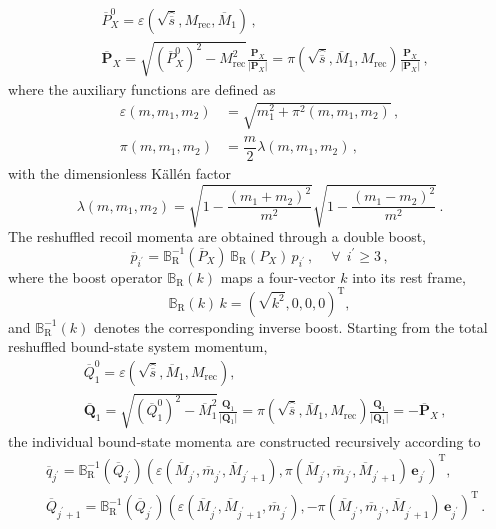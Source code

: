 \begin{align}
    &\overline{P}_X^0 = \varepsilon\!\left(\sqrt{\hat{\overline{s}}},M_\mathrm{rec},\overline{M}_{1}\right)\,,\\
    &\overline{\bm P}_X = \sqrt{\left(\overline{P}_X^0\right)^2-M_{\mathrm{rec}}^2}\frac{\bm{P}_X}{\vert \bm{P}_X \vert}=\pi\!\left(\sqrt{\hat{\overline{s}}},\overline{M}_{1},M_\mathrm{rec}\right)\frac{\bm{P}_X}{\vert \bm{P}_X \vert}\,,
\end{align}
where the auxiliary functions are defined as
\begin{align}
    \varepsilon(m,m_1,m_2) & = \sqrt{m_1^2 + \pi^2(m,m_1,m_2)}\,,\\
    \pi(m,m_1,m_2) & = \dfrac{m}{2}\lambda(m,m_1,m_2)\,,
\end{align}
with the dimensionless K\"all\'en factor
\begin{equation}
    \lambda(m,m_1,m_2) = \sqrt{1-\dfrac{(m_1+m_2)^2}{m^2}}\sqrt{1-\dfrac{(m_1 - m_2)^2}{m^2}}\,.
\end{equation}
The reshuffled recoil momenta are obtained through a double boost,
\begin{equation}
    \overline{p}_{i^\prime} = \mathds{B}_\mathrm{R}^{-1}(\overline{P}_X)\,\mathds{B}_\mathrm{R}(P_X)\,p_{i^\prime}\,,\quad \ \forall\ \ i^\prime\ge3\,,
\end{equation}
where the boost operator $\mathds{B}_\mathrm{R}(k)$ maps a four-vector $k$ into its rest frame,
\begin{equation}
    \mathds{B}_\mathrm{R}(k)\,k = (\sqrt{k^2},0,0,0)^\mathrm{T},
\end{equation}
and $\mathds{B}^{-1}_\mathrm{R}(k)$ denotes the corresponding inverse boost. Starting from the total reshuffled bound-state system momentum,
\begin{align}
    & \overline{Q}_{1}^0 = \varepsilon\!\left(\sqrt{\hat{\overline{s}}}, \overline{M}_{1}, M_\mathrm{rec}\right),
\label{eq:overlineQ101}\\
    & \overline{\bm Q}_{1} = \sqrt{\left( \overline{Q}_{1}^0 \right)^2 - \overline{M}_1^2} \frac{{\bm Q}_1}{\vert {\bm Q}_1\vert} = \pi\!\left(\sqrt{\hat{\overline{s}}}, \overline{M}_1, M_{\mathrm{rec}}\right) \frac{{\bm Q}_1}{\vert {\bm Q}_1\vert} = -\overline{\bm P}_X \, ,
\label{eq:overlineQ1vec1}
\end{align}
the individual bound-state momenta are constructed recursively according to
\begin{align}
    & \overline{q}_{j^\prime} = \mathds{B}_\mathrm{R}^{-1}(\overline{Q}_{j^\prime})\left(\varepsilon(\overline{M}_{j^\prime},\overline{m}_{j^\prime},\overline{M}_{j^\prime+1}),\pi(\overline{M}_{j^\prime},\overline{m}_{j^\prime},\overline{M}_{j^\prime+1})\,{\bm e}_{j^\prime}\right)^\mathrm{T},\\
    & \overline{Q}_{j^\prime+1} = \mathds{B}_\mathrm{R}^{-1}(\overline{Q}_{j^\prime})\left(\varepsilon(\overline{M}_{j^\prime},\overline{M}_{j^\prime+1},\overline{m}_{j^\prime}),-\pi(\overline{M}_{j^\prime},\overline{m}_{j^\prime},\overline{M}_{j^\prime+1})\,{\bm e}_{j^\prime}\right)^\mathrm{T}\,.
\end{align}
